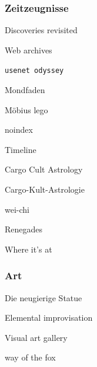 \subsubsection*{Zeitzeugnisse}
\begin{list}{}{\setlength{\leftmargin}{13pt}}
\item[\ipdfen] Discoveries revisited
\vspace{-1.0mm}
\item[\ipdfen] Web archives
\vspace{-1.0mm}
\item[\ipdfen] \texttt{usenet odyssey}
\vspace{-1.4mm}
\item[\ipdfde] Mondfaden
\vspace{-1.0mm}
\item[\ipdfen] Möbius lego
\vspace{-1.2mm}
\item[\iweb] noindex
\vspace{-1.1mm}
\item[\ipdfen] Timeline
\vspace{-1.0mm}
\item[\ipdfen] Cargo Cult Astrology
\vspace{-1.4mm}
\item[\ipdfde] Cargo-Kult-Astrologie
\vspace{-1.4mm}
\item[\ipdfen] wei-chi
\vspace{-1.1mm}
\item[\ipdfblueen] {\color{odyssey}Renegades}
\vspace{-1.4mm}
\item[\ipdfblueen] {\color{odyssey}Where it’s at}
\end{list}

\subsubsection*{Art}
\begin{list}{}{\setlength{\leftmargin}{13pt}}
\item[\ipdfde] Die neugierige Statue
\vspace{-1.4mm}
\item[\ipdfen] Elemental improvisation
\vspace{-1.4mm}
\item[\ipdfen] Visual art gallery
\vspace{-1.4mm}
\item[\ipdfblueen] {\color{odyssey}way of the fox}
\end{list}
